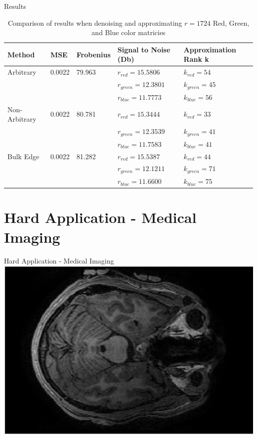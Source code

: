 \documentclass[aspectratio=169,xcolor=dvipsnames]{beamer}
\begin{document}
	\begin{frame}{Results}
		\begin{table}
			\begin{tabular}{l | l | l | l |l}
				\toprule
				\textbf{Method} & \textbf{MSE} & \textbf{Frobenius} & \textbf{Signal to Noise (Db)} & \textbf{Approximation Rank k} \\
				\midrule
				Arbitrary          & 0.0022           & 79.963 &  $r_{red} = 15.5806$ &  $k_{red} = 54$ \\
				& & & $r_{green} = 12.3801$ & $k_{green} = 45$ \\
				& & & $r_{blue} = 11.7773$ & $k_{blue} = 56$\\\hline
				Non-Arbitrary         & 0.0022            & 80.781 & $r_{red} = 15.3444$ & $k_{red} = 33$             \\
				& & & $r_{green} = 12.3539$ & $k_{green} = 41$\\
				& & & $r_{blue} = 11.7583$ & $k_{blue} = 41$\\\hline
				Bulk Edge       & 0.0022            & 81.282 & $r_{red} = 15.5387$ &      $k_{red} = 44$         \\
				& & & $r_{green} = 12.1211$ & $k_{green} = 71$\\
				& & & $r_{blue} = 11.6600$  & $k_{blue} = 75$\\
				\bottomrule
			\end{tabular}
			\caption{Comparison of results when denoising and approximating $r = 1724$ Red, Green, and Blue color matricies}
		\end{table}
	\end{frame}
	
	\section{Hard Application - Medical Imaging}
	
	\begin{frame}{Hard Application - Medical Imaging}
		\centering
		\includegraphics[scale=0.5]{BrainScan.png}
	\end{frame}
		
\end{document}
